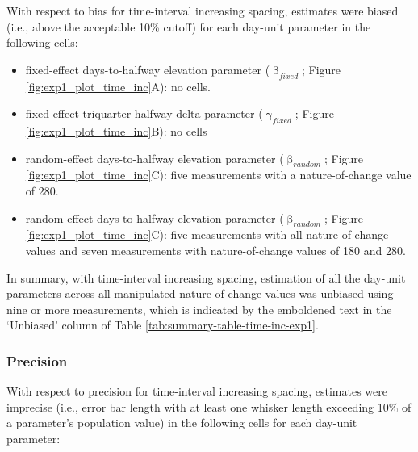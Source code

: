\documentclass[
12pt, %
twoside,
english]{guelphthesis}
\begin{document}
With respect to bias for time-interval increasing spacing, estimates were biased (i.e., above the acceptable 10\% cutoff) for each day-unit parameter in the following cells:
\begin{itemize}
\tightlist
\item
  fixed-effect days-to-halfway elevation parameter (\(\upbeta_{fixed}\); Figure \ref{fig:exp1_plot_time_inc}A): no cells.
\item
  fixed-effect triquarter-halfway delta parameter (\(\upgamma_{fixed}\); Figure \ref{fig:exp1_plot_time_inc}B): no cells
\item
  random-effect days-to-halfway elevation parameter (\(\upbeta_{random}\); Figure \ref{fig:exp1_plot_time_inc}C): five measurements with a nature-of-change value of 280.
\item
  random-effect days-to-halfway elevation parameter (\(\upbeta_{random}\); Figure \ref{fig:exp1_plot_time_inc}C): five measurements with all nature-of-change values and seven measurements with nature-of-change values of 180 and 280.
\end{itemize}
In summary, with time-interval increasing spacing, estimation of all the day-unit parameters across all manipulated nature-of-change values was unbiased using nine or more measurements, which is indicated by the emboldened text in the `Unbiased' column of Table \ref{tab:summary-table-time-inc-exp1}.

\hypertarget{precision-time-inc-exp1}{%
\subsubsection{Precision}\label{precision-time-inc-exp1}}

With respect to precision for time-interval increasing spacing, estimates were imprecise (i.e., error bar length with at least one whisker length exceeding 10\% of a parameter's population value) in the following cells for each day-unit parameter:
\end{document}
